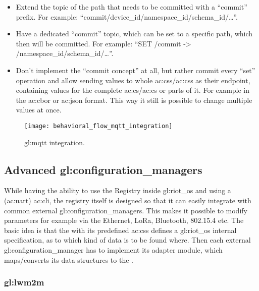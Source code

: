 \begin{itemize}
    \item Extend the topic of the path that needs to be committed with a ``commit'' prefix.
          For example: ``commit/device\_id/namespace\_id/schema\_id/\dots''.

    \item Have a dedicated ``commit'' topic, which can be set to a specific path, which then will be committed.
          For example:
          ``SET /commit -> /namespace\_id/schema\_id/\dots''.

    \item Don't implement the ``commit concept'' at all, but rather commit every ``set'' operation and allow sending values to whole \glspl{ac:cs}/\glspl{ac:cs} as their endpoint, containing values for the complete \gls{ac:cs}/\gls{ac:cs} or parts of it.
          For example in the \gls{ac:cbor} or \gls{ac:json} format. This way it still is possible to change multiple values at once.
\end{itemize}

\begin{figure}[H]
    \centering
    \texttt{[image: behavioral\_flow\_mqtt\_integration]}
    \caption{\gls{gl:mqtt} integration.}
    \label{fig:mqtt_integration}
\end{figure}

\subsection{Advanced \glspl*{gl:configuration_manager}}
\label{sec:design:integrating_external_configuration_managers:advanced_configuration_managers}

While having the ability to use the Registry inside \gls{gl:riot_os} and using a (\acrshort{ac:uart}) \gls{ac:cli}, the registry itself is designed so that it can easily integrate with common external \glspl{gl:configuration_manager}.
This makes it possible to modify parameters for example via the Ethernet, LoRa, Bluetooth, 802.15.4 etc.
The basic idea is that the  with its predefined \glspl{ac:cs} defines a \gls{gl:riot_os} internal specification, as to which kind of data is to be found where.
Then each external \gls{gl:configuration_manager} has to implement its adapter module, which maps/converts its data structures to the .

\subsubsection{\gls*{gl:lwm2m}}

